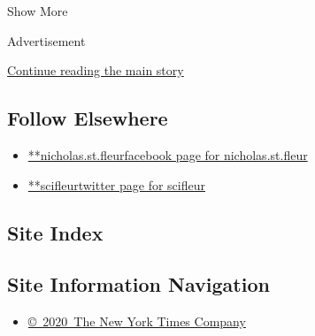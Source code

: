 Show More

Advertisement

\protect\hyperlink{after-mid2}{Continue reading the main story}

\hypertarget{follow-elsewhere}{%
\subsection{Follow Elsewhere}\label{follow-elsewhere}}

\begin{itemize}
\tightlist
\item
  \href{https://www.facebookcorewwwi.onion/nicholas.st.fleur}{**nicholas.st.fleurfacebook
  page for nicholas.st.fleur}
\item
  \href{https://twitter.com/scifleur}{**scifleurtwitter page for
  scifleur}
\end{itemize}

\hypertarget{site-index}{%
\subsection{Site Index}\label{site-index}}

\hypertarget{site-information-navigation}{%
\subsection{Site Information
Navigation}\label{site-information-navigation}}

\begin{itemize}
\tightlist
\item
  \href{https://help.nytimes3xbfgragh.onion/hc/en-us/articles/115014792127-Copyright-notice}{©~2020~The
  New York Times Company}
\end{itemize}

